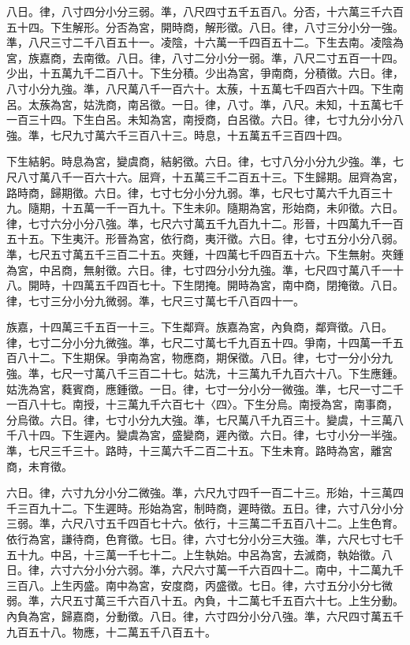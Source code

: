 \begin{pinyinscope}
八日。律，八寸四分小分三弱。準，八尺四寸五千五百八。分否，十六萬三千六百五十四。下生解形。分否為宮，開時商，解形徵。八日。律，八寸三分小分一強。準，八尺三寸二千八百五十一。凌陰，十六萬一千四百五十二。下生去南。凌陰為宮，族嘉商，去南徵。八日。律，八寸二分小分一弱。準，八尺二寸五百一十四。少出，十五萬九千二百八十。下生分積。少出為宮，爭南商，分積徵。六日。律，八寸小分九強。準，八尺萬八千一百六十。太蔟，十五萬七千四百六十四。下生南呂。太蔟為宮，姑洗商，南呂徵。一日。律，八寸。準，八尺。未知，十五萬七千一百三十四。下生白呂。未知為宮，南授商，白呂徵。六日。律，七寸九分小分八強。準，七尺九寸萬六千三百八十三。時息，十五萬五千三百四十四。

下生結躬。時息為宮，變虞商，結躬徵。六日。律，七寸八分小分九少強。準，七尺八寸萬八千一百六十六。屈齊，十五萬三千二百五十三。下生歸期。屈齊為宮，路時商，歸期徵。六日。律，七寸七分小分九弱。準，七尺七寸萬六千九百三十九。隨期，十五萬一千一百九十。下生未卯。隨期為宮，形始商，未卯徵。六日。律，七寸六分小分八強。準，七尺六寸萬五千九百九十二。形晉，十四萬九千一百五十五。下生夷汗。形晉為宮，依行商，夷汗徵。六日。律，七寸五分小分八弱。準，七尺五寸萬五千三百二十五。夾鍾，十四萬七千四百五十六。下生無射。夾鍾為宮，中呂商，無射徵。六日。律，七寸四分小分九強。準，七尺四寸萬八千一十八。開時，十四萬五千四百七十。下生閉掩。開時為宮，南中商，閉掩徵。八日。律，七寸三分小分九微弱。準，七尺三寸萬七千八百四十一。

族嘉，十四萬三千五百一十三。下生鄰齊。族嘉為宮，內負商，鄰齊徵。八日。律，七寸二分小分九微強。準，七尺二寸萬七千九百五十四。爭南，十四萬一千五百八十二。下生期保。爭南為宮，物應商，期保徵。八日。律，七寸一分小分九強。準，七尺一寸萬八千三百二十七。姑洗，十三萬九千九百六十八。下生應鍾。姑洗為宮，蕤賓商，應鍾徵。一日。律，七寸一分小分一微強。準，七尺一寸二千一百八十七。南授，十三萬九千六百七十〈四〉。下生分烏。南授為宮，南事商，分烏徵。六日。律，七寸小分九大強。準，七尺萬八千九百三十。變虞，十三萬八千八十四。下生遲內。變虞為宮，盛變商，遲內徵。六日。律，七寸小分一半強。準，七尺三千三十。路時，十三萬六千二百二十五。下生未育。路時為宮，離宮商，未育徵。

六日。律，六寸九分小分二微強。準，六尺九寸四千一百二十三。形始，十三萬四千三百九十二。下生遲時。形始為宮，制時商，遲時徵。五日。律，六寸八分小分三弱。準，六尺八寸五千四百七十六。依行，十三萬二千五百八十二。上生色育。依行為宮，謙待商，色育徵。七日。律，六寸七分小分三大強。準，六尺七寸七千五十九。中呂，十三萬一千七十二。上生執始。中呂為宮，去滅商，執始徵。八日。律，六寸六分小分六弱。準，六尺六寸萬一千六百四十二。南中，十二萬九千三百八。上生丙盛。南中為宮，安度商，丙盛徵。七日。律，六寸五分小分七微弱。準，六尺五寸萬三千六百八十五。內負，十二萬七千五百六十七。上生分動。內負為宮，歸嘉商，分動徵。八日。律，六寸四分小分八強。準，六尺四寸萬五千九百五十八。物應，十二萬五千八百五十。


\end{pinyinscope}
